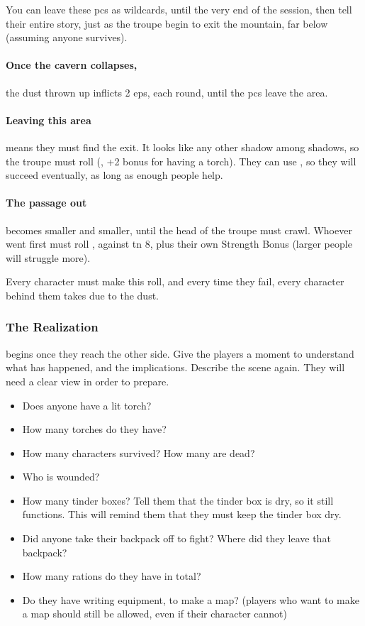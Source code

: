 \begin{multicols}{2}
You can leave these \glspl{pc} as wildcards, until the very end of the session, then tell their entire story, just as the troupe begin to exit the mountain, far below (assuming anyone survives).

\paragraph{Once the cavern collapses,}
the dust thrown up inflicts 2 \glspl{ep}, each round, until the \glspl{pc} leave the \gls{area}.

\paragraph{Leaving this area}
means they must find the exit.
It looks like any other shadow among shadows, so the troupe must roll  (\tn[10], +2 bonus for having a torch).
They can use , so they will succeed eventually, as long as enough people help.

\paragraph{The passage out}
becomes smaller and smaller, until the head of the troupe must crawl.
Whoever went first must roll , against \gls{tn} 8, plus their own Strength Bonus (larger people will struggle more).

Every character must make this roll, and every time they fail, every character behind them takes  due to the dust.

\subsubsection{The Realization}
begins once they reach the other side.
Give the players a moment to understand what has happened, and the implications.
Describe the scene again.
They will need a clear view in order to prepare.

\begin{itemize}
  \item
  Does anyone have a lit torch?
  \item
  How many torches do they have?
  \item
  How many characters survived?
  How many are dead?
  \item
  Who is wounded?
  \item
  How many tinder boxes?
  Tell them that the tinder box is dry, so it still functions.
  This will remind them that they must keep the tinder box dry.
  \item
  Did anyone take their backpack off to fight?
  Where did they leave that backpack?
  \item
  How many rations do they have in total?
  \item
  Do they have writing equipment, to make a map?
  (players who want to make a map should still be allowed, even if their character cannot)
\end{itemize}


\end{multicols}
